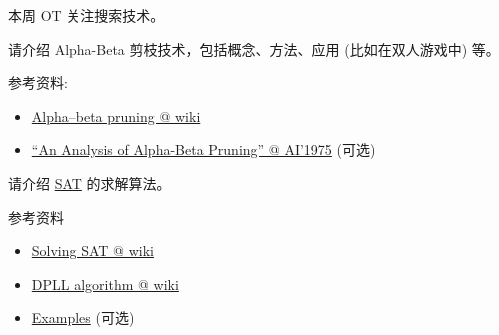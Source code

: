 \documentclass[a4paper, justified]{tufte-handout}
\begin{document}
\beginoptional

\begin{problem}[DH 4-10]
\end{problem}

\begin{solution}
\end{solution}

\beginot

本周 OT 关注搜索技术。

\begin{ot}
  请介绍 Alpha-Beta 剪枝技术，包括概念、方法、应用 (比如在双人游戏中) 等。

  \noindent 参考资料:
  \begin{itemize}
    \item \href{https://en.wikipedia.org/wiki/Alpha\%E2\%80\%93beta\_pruning}{Alpha–beta pruning @ wiki}
    \item \href{https://github.com/hengxin/problem-solving-class-paperswelove/blob/master/2nd-semester/Knuth\%20(AI\%2C\%201975)\%20An\%20Analysis\%20of\%20Alpha-Beta\%20Pruning.pdf}{``An Analysis of Alpha-Beta Pruning'' @ AI'1975} (可选)
  \end{itemize}
\end{ot}

\begin{solution}
\end{solution}
\begin{ot}
  请介绍 \href{https://en.wikipedia.org/wiki/SAT\_solver}{SAT} 的求解算法。

  \noindent 参考资料
  \begin{itemize}
    \item \href{https://en.wikipedia.org/wiki/SAT\_solver#Algorithms\_for\_solving\_SAT}{Solving SAT @ wiki}
    \item \href{https://en.wikipedia.org/wiki/DPLL\_algorithm}{DPLL algorithm @ wiki}
    \item \href{https://yurichev.com/writings/SAT\_SMT\_by\_example.pdf}{Examples} (可选)
  \end{itemize}
\end{ot}


\end{document}
